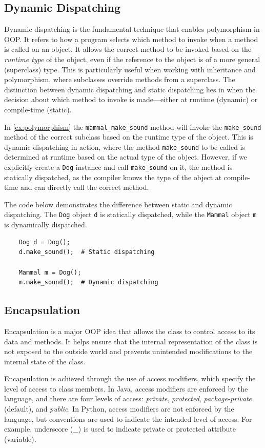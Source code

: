 \documentclass[oneside,11pt,dvipsnames]{book}
\newcommand{\code}[1]{\texttt{#1}}
\begin{document}
\subsection{Dynamic Dispatching}\label{sec:dynamic-dispatching}

Dynamic dispatching is the fundamental technique that enables polymorphism in OOP. It refers to how a program selects which method to invoke when a method is called on an object.  It allows the correct method to be invoked based on the \emph{runtime type} of the object, even if the reference to the object is of a more general (superclass) type. This is particularly useful when working with inheritance and polymorphism, where subclasses override methods from a superclass.
The distinction between dynamic dispatching and static dispatching lies in when the decision about which method to invoke is made—either at runtime (dynamic) or compile-time (static).

In \autoref{ex:polymorphism} the \code{mammal\_make\_sound} method will invoke the \code{make\_sound} method of the correct subclass based on the runtime type of the object. This is dynamic dispatching in action, where the method \code{make\_sound} to be called is determined at runtime based on the actual type of the object.  However, if we explicitly create a \code{Dog} instance and call \code{make\_sound} on it, the method is statically dispatched, as the compiler knows the type of the object at compile-time and can directly call the correct method.

The code below demonstrates the difference between static and dynamic dispatching. The \code{Dog} object \code{d} is statically dispatched, while the \code{Mammal} object \code{m} is dynamically dispatched.
\begin{lstlisting}
    Dog d = Dog();
    d.make_sound();  # Static dispatching

    Mammal m = Dog();
    m.make_sound();  # Dynamic dispatching
\end{lstlisting}    

\subsection{Encapsulation}
Encapsulation is a major OOP idea that allows the class to control access to its data and methods. It helps ensure that the internal representation of the class is not exposed to the outside world and prevents unintended modifications to the internal state of the class.

Encapsulation is achieved through the use of access modifiers, which specify the level of access to class members. In Java, access modifiers are enforced by the language, and there are four levels of access: \emph{private}, \emph{protected}, \emph{package-private} (default), and \emph{public}.  In Python, access modifiers are not enforced by the language, but conventions are used to indicate the intended level of access. For example, underscore (\_) is used to indicate private or protected attribute (variable). %
\end{document}
